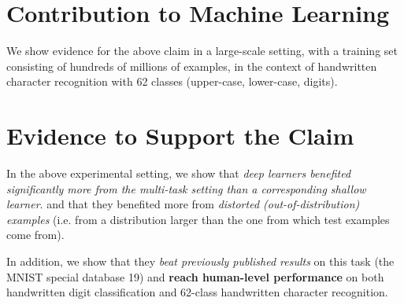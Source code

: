 \documentclass{article} %
\begin{document}
\section*{Contribution to Machine Learning}

We show evidence for the above claim in a large-scale setting, with
a training set consisting of hundreds of millions of examples, in the
context of handwritten character recognition with 62 classes (upper-case,
lower-case, digits).

\section*{Evidence to Support the Claim}

In the above experimental setting, we show that {\em deep learners benefited
significantly more from the multi-task setting than a corresponding shallow
  learner}. and that they benefited more from {\em distorted (out-of-distribution) examples}
(i.e. from a distribution larger than the one from which test examples come from).

In addition, we show that they {\em beat previously published results} on this task 
(the MNIST special database 19)
and {\bf reach human-level performance} on both handwritten digit classification and
62-class handwritten character recognition.

\newpage

{\small

%

%
}
\end{document}
